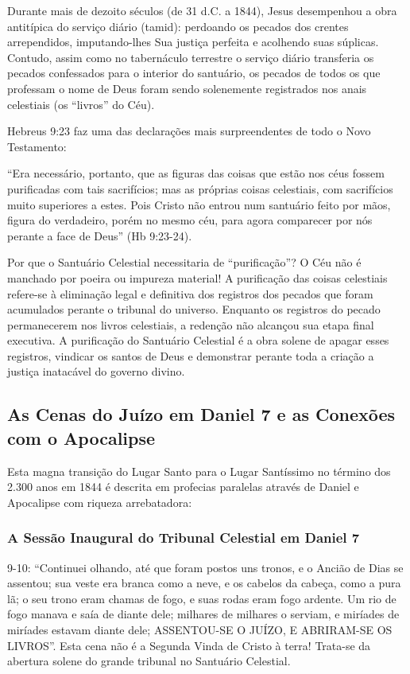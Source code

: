 \documentclass[11pt,a4paper,openany]{book}
\begin{document}
Durante mais de dezoito séculos (de 31 d.C. a 1844), Jesus desempenhou a obra antitípica do serviço diário (tamid): perdoando os pecados dos crentes arrependidos, imputando-lhes Sua justiça perfeita e acolhendo suas súplicas. Contudo, assim como no tabernáculo terrestre o serviço diário transferia os pecados confessados para o interior do santuário, os pecados de todos os que professam o nome de Deus foram sendo solenemente registrados nos anais celestiais (os ``livros'' do Céu).

Hebreus 9:23 faz uma das declarações mais surpreendentes de todo o Novo Testamento:

``Era necessário, portanto, que as figuras das coisas que estão nos céus fossem purificadas com tais sacrifícios; mas as próprias coisas celestiais, com sacrifícios muito superiores a estes. Pois Cristo não entrou num santuário feito por mãos, figura do verdadeiro, porém no mesmo céu, para agora comparecer por nós perante a face de Deus'' (Hb 9:23-24).

Por que o Santuário Celestial necessitaria de ``purificação''? O Céu não é manchado por poeira ou impureza material! A purificação das coisas celestiais refere-se à eliminação legal e definitiva dos registros dos pecados que foram acumulados perante o tribunal do universo. Enquanto os registros do pecado permanecerem nos livros celestiais, a redenção não alcançou sua etapa final executiva. A purificação do Santuário Celestial é a obra solene de apagar esses registros, vindicar os santos de Deus e demonstrar perante toda a criação a justiça inatacável do governo divino.



\subsection{As Cenas do Juízo em Daniel 7 e as Conexões com o Apocalipse}


Esta magna transição do Lugar Santo para o Lugar Santíssimo no término dos 2.300 anos em 1844 é descrita em profecias paralelas através de Daniel e Apocalipse com riqueza arrebatadora:


\subsubsection*{A Sessão Inaugural do Tribunal Celestial em Daniel 7}
9-10:
``Continuei olhando, até que foram postos uns tronos, e o Ancião de Dias se assentou; sua veste era branca como a neve, e os cabelos da cabeça, como a pura lã; o seu trono eram chamas de fogo, e suas rodas eram fogo ardente. Um rio de fogo manava e saía de diante dele; milhares de milhares o serviam, e miríades de miríades estavam diante dele; ASSENTOU-SE O JUÍZO, E ABRIRAM-SE OS LIVROS''.
Esta cena não é a Segunda Vinda de Cristo à terra! Trata-se da abertura solene do grande tribunal no Santuário Celestial.
\end{document}
